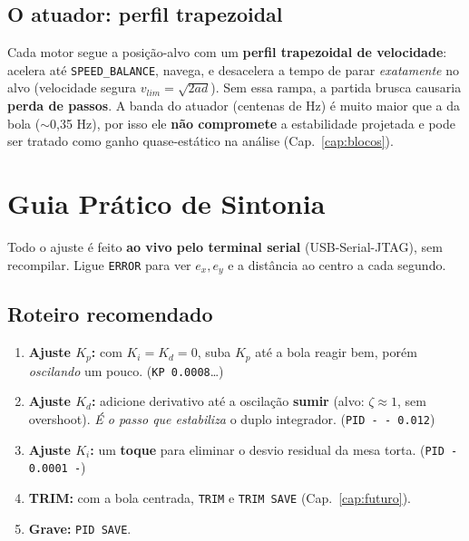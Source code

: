 \section{O atuador: perfil trapezoidal}
Cada motor segue a posi\c{c}\~ao-alvo com um \textbf{perfil trapezoidal de
velocidade}: acelera at\'e \texttt{SPEED\_BALANCE}, navega, e desacelera a tempo de
parar \emph{exatamente} no alvo (velocidade segura $v_{lim}=\sqrt{2ad}$). Sem essa
rampa, a partida brusca causaria \textbf{perda de passos}. A banda do atuador
(centenas de Hz) \'e muito maior que a da bola ($\sim$0,35 Hz), por isso ele
\textbf{n\~ao compromete} a estabilidade projetada e pode ser tratado como ganho
quase-est\'atico na an\'alise (Cap.~\ref{cap:blocos}).

\chapter{Guia Pr\'atico de Sintonia}\label{cap:sintonia}

Todo o ajuste \'e feito \textbf{ao vivo pelo terminal serial} (USB-Serial-JTAG),
sem recompilar. Ligue \texttt{ERROR} para ver $e_x,e_y$ e a dist\^ancia ao centro a
cada segundo.

\section{Roteiro recomendado}
\begin{enumerate}[leftmargin=1.5em]
  \item \textbf{Ajuste $K_p$:} com $K_i=K_d=0$, suba $K_p$ at\'e a bola reagir bem,
  por\'em \emph{oscilando} um pouco. (\texttt{KP 0.0008}\dots)
  \item \textbf{Ajuste $K_d$:} adicione derivativo at\'e a oscila\c{c}\~ao
  \textbf{sumir} (alvo: $\zeta\!\approx\!1$, sem overshoot). \emph{\'E o passo que
  estabiliza} o duplo integrador. (\texttt{PID - - 0.012})
  \item \textbf{Ajuste $K_i$:} um \textbf{toque} para eliminar o desvio residual da
  mesa torta. (\texttt{PID - 0.0001 -})
  \item \textbf{TRIM:} com a bola centrada, \texttt{TRIM} e \texttt{TRIM SAVE}
  (Cap.~\ref{cap:futuro}).
  \item \textbf{Grave:} \texttt{PID SAVE}.
\end{enumerate}

